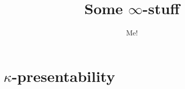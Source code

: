 \documentclass{article}
\title{Some \(\infty\)-stuff}
\author{Me!}
\begin{document}
\maketitle

\section{\(\kappa\)-presentability}
\label{sec:kappa-presentability}
\end{document}
